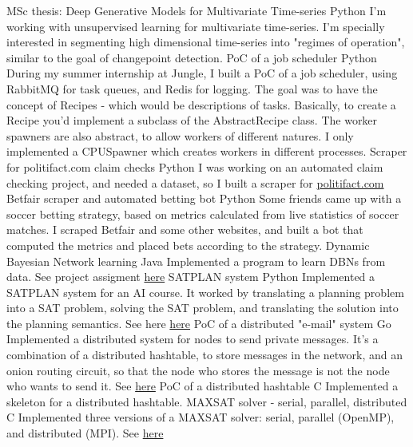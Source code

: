 \documentclass[]{colobas}
\begin{document}
\entry
  {}
  {MSc thesis: Deep Generative Models for Multivariate Time-series}
  {Python}
  {I'm working with unsupervised learning for multivariate time-series. I'm
  specially interested in segmenting high dimensional time-series into
  "regimes of operation", similar to the goal of changepoint detection.}
\entry
  {}
  {PoC of a job scheduler}
  {Python}
  {During my summer internship at Jungle, I built a PoC of a job scheduler,
  using RabbitMQ for task queues, and Redis for logging. The goal was to have
  the concept of Recipes - which would be descriptions of tasks. Basically,
  to create a Recipe you'd implement a subclass of the AbstractRecipe class.
  The worker spawners are also abstract, to allow workers of different natures.
  I only implemented a CPUSpawner which creates workers in different processes.}
\entry
  {}
  {Scraper for politifact.com claim checks}
  {Python}
  {I was working on an automated claim checking project, and needed a dataset,
  so I built a scraper for \href{politifact.com}{politifact.com}}
\entry
  {}
  {Betfair scraper and automated betting bot}
  {Python}
  {Some friends came up with a soccer betting strategy, based on metrics 
  calculated from live statistics of soccer matches. I scraped Betfair and some
  other websites, and built a bot that computed the metrics and placed bets
  according to the strategy.}
\entry
  {}
  {Dynamic Bayesian Network learning}
  {Java}
  {Implemented a program to learn DBNs from data. See project assigment 
  \href{https://fenix.tecnico.ulisboa.pt/downloadFile/1689468335554723/apresentacao-projecto-POO1415.pdf}{here}}
\entry
  {}
  {SATPLAN system}
  {Python}
  {Implemented a SATPLAN system for an AI course. It worked by translating a
  planning problem into a SAT problem, solving the SAT problem, and translating
  the solution into the planning semantics. See here \href{https://github.com/colobas/ia-proj2}{here}}
\entry
  {}
  {PoC of a distributed "e-mail" system}
  {Go}
  {Implemented a distributed system for nodes to send private messages. It's a
  combination of a distributed hashtable, to store messages in the network, and
  an onion routing circuit, so that the node who stores the message is not the
  node who wants to send it. See \href{https://github.com/colobas/distributed-email}{here}}
\entry
  {}
  {PoC of a distributed hashtable}
  {C}
  {Implemented a skeleton for a distributed hashtable.}
\entry
  {}
  {MAXSAT solver - serial, parallel, distributed}
  {C}
  {Implemented three versions of a MAXSAT solver: serial, parallel (OpenMP), and
  distributed (MPI). See \href{https://github.com/colobas/maxsat-solver}{here}}
\end{document}
